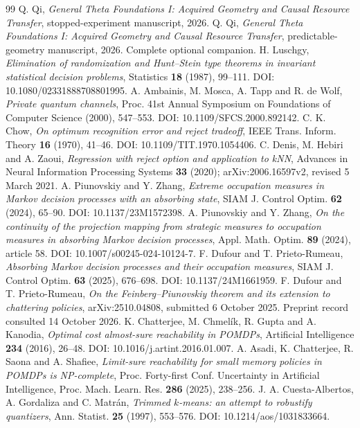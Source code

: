 \begin{thebibliography}{99}
 Q. Qi, \emph{General Theta Foundations I: Acquired Geometry and Causal Resource Transfer}, stopped-experiment manuscript, 2026.
 Q. Qi, \emph{General Theta Foundations I: Acquired Geometry and Causal Resource Transfer}, predictable-geometry manuscript, 2026. Complete optional companion.
 H. Luschgy, \emph{Elimination of randomization and Hunt--Stein type theorems in invariant statistical decision problems}, Statistics \textbf{18} (1987), 99--111. DOI: 10.1080/02331888708801995.
 A. Ambainis, M. Mosca, A. Tapp and R. de Wolf, \emph{Private quantum channels}, Proc. 41st Annual Symposium on Foundations of Computer Science (2000), 547--553. DOI: 10.1109/SFCS.2000.892142.
 C. K. Chow, \emph{On optimum recognition error and reject tradeoff}, IEEE Trans. Inform. Theory \textbf{16} (1970), 41--46. DOI: 10.1109/TIT.1970.1054406.
 C. Denis, M. Hebiri and A. Zaoui, \emph{Regression with reject option and application to kNN}, Advances in Neural Information Processing Systems \textbf{33} (2020); arXiv:2006.16597v2, revised 5 March 2021.
 A. Piunovskiy and Y. Zhang, \emph{Extreme occupation measures in Markov decision processes with an absorbing state}, SIAM J. Control Optim. \textbf{62} (2024), 65--90. DOI: 10.1137/23M1572398.
 A. Piunovskiy and Y. Zhang, \emph{On the continuity of the projection mapping from strategic measures to occupation measures in absorbing Markov decision processes}, Appl. Math. Optim. \textbf{89} (2024), article 58. DOI: 10.1007/s00245-024-10124-7.
 F. Dufour and T. Prieto-Rumeau, \emph{Absorbing Markov decision processes and their occupation measures}, SIAM J. Control Optim. \textbf{63} (2025), 676--698. DOI: 10.1137/24M1661959.
 F. Dufour and T. Prieto-Rumeau, \emph{On the Feinberg--Piunovskiy theorem and its extension to chattering policies}, arXiv:2510.04808, submitted 6 October 2025. Preprint record consulted 14 October 2026.
 K. Chatterjee, M. Chmel\'ik, R. Gupta and A. Kanodia, \emph{Optimal cost almost-sure reachability in POMDPs}, Artificial Intelligence \textbf{234} (2016), 26--48. DOI: 10.1016/j.artint.2016.01.007.
 A. Asadi, K. Chatterjee, R. Saona and A. Shafiee, \emph{Limit-sure reachability for small memory policies in POMDPs is NP-complete}, Proc. Forty-first Conf. Uncertainty in Artificial Intelligence, Proc. Mach. Learn. Res. \textbf{286} (2025), 238--256.
 J. A. Cuesta-Albertos, A. Gordaliza and C. Matr\'an, \emph{Trimmed $k$-means: an attempt to robustify quantizers}, Ann. Statist. \textbf{25} (1997), 553--576. DOI: 10.1214/aos/1031833664.

\end{thebibliography}
